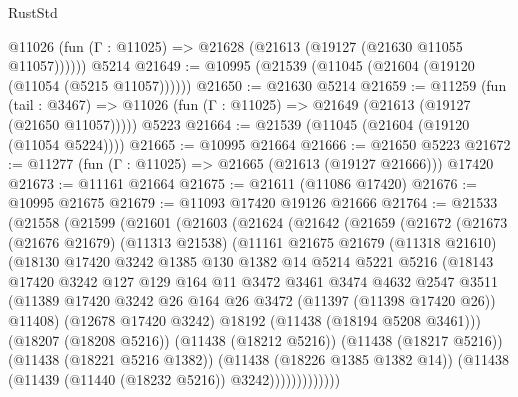 \begin{lexlean}{RustStd}
\begin{coremodule}
      @11026 (fun (Γ : @11025) => @21628 (@21613 (@19127 (@21630 @11055 @11057))))))
    @5214
@21649 := @10995 (@21539 (@11045 (@21604 (@19120 (@11054 (@5215 @11057))))))
@21650 := @21630 @5214
@21659 := @11259
    (fun (tail : @3467) => @11026 (fun (Γ : @11025) => @21649 (@21613 (@19127 (@21650 @11057)))))
    @5223
@21664 := @21539 (@11045 (@21604 (@19120 (@11054 @5224))))
@21665 := @10995 @21664
@21666 := @21650 @5223
@21672 := @11277 (fun (Γ : @11025) => @21665 (@21613 (@19127 @21666))) @17420
@21673 := @11161 @21664
@21675 := @21611 (@11086 @17420)
@21676 := @10995 @21675
@21679 := @11093 @17420 @19126 @21666
@21764 := @21533
    (@21558
      (@21599
        (@21601
          (@21603
            (@21624
              (@21642
                (@21659
                  (@21672
                    (@21673
                      (@21676 @21679)
                      (@11313 @21538)
                      (@11161
                        @21675
                        @21679
                        (@11318 @21610)
                        (@18130
                          @17420
                          @3242
                          @1385
                          @130
                          @1382
                          @14
                          @5214
                          @5221
                          @5216
                          (@18143
                            @17420
                            @3242
                            @127
                            @129
                            @164
                            @11
                            @3472
                            @3461
                            @3474
                            @4632
                            @2547
                            @3511
                            (@11389
                              @17420
                              @3242
                              @26
                              @164
                              @26
                              @3472
                              (@11397 (@11398 @17420 @26))
                              @11408)
                            (@12678 @17420 @3242)
                            @18192
                            (@11438 (@18194 @5208 @3461)))
                          (@18207 (@18208 @5216))
                          (@11438 (@18212 @5216))
                          (@11438 (@18217 @5216))
                          (@11438 (@18221 @5216 @1382))
                          (@11438 (@18226 @1385 @1382 @14))
                          (@11438 (@11439 (@11440 (@18232 @5216)) @3242)))))))))))))

\end{coremodule}
\end{lexlean}
